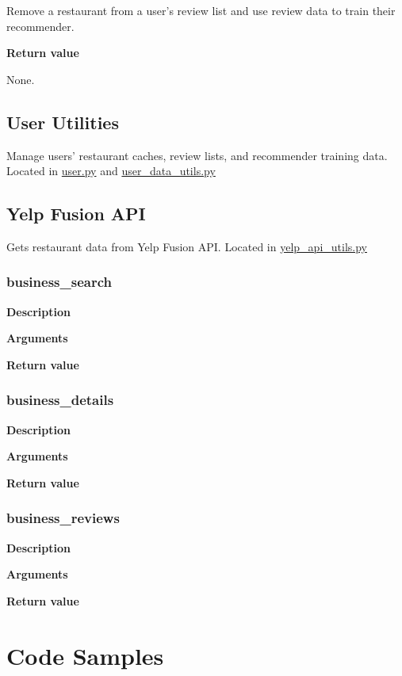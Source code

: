 \documentclass[11pt]{article}
\begin{document}
Remove a restaurant from a user's review list and use review data to train their recommender.

\textbf{Return value}

None.

\subsection{User Utilities}
Manage users' restaurant caches, review lists, and recommender training data. Located in \url{user.py} and \url{user\_data\_utils.py}



\subsection{Yelp Fusion API}
Gets restaurant data from Yelp Fusion API. Located in \url{yelp\_api\_utils.py}

\subsubsection{business\_search}
\textbf{Description}

\textbf{Arguments}
\begin{deflist}
	\item[]
\end{deflist}

\textbf{Return value}

\subsubsection{business\_details}
\textbf{Description}

\textbf{Arguments}
\begin{deflist}
	\item[]
\end{deflist}

\textbf{Return value}

\subsubsection{business\_reviews}
\textbf{Description}

\textbf{Arguments}
\begin{deflist}
	\item[]
\end{deflist}

\textbf{Return value}

\pagebreak

\section{Code Samples}
\subsection{}
\end{document}
